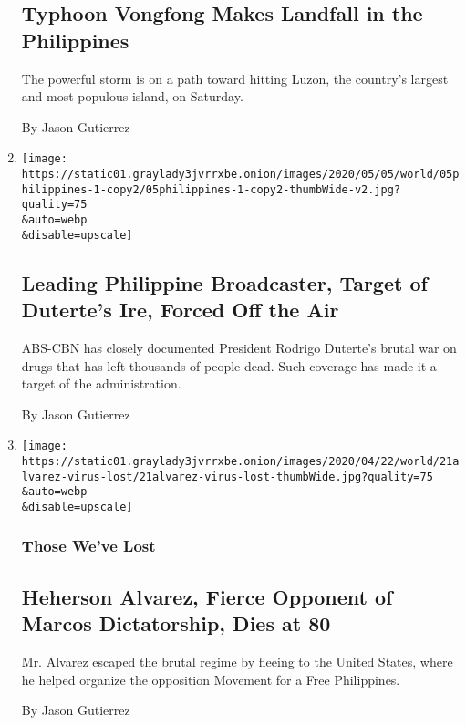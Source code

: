 \begin{enumerate}
  \hypertarget{typhoon-vongfong-makes-landfall-in-the-philippines}{%
  \subsection{Typhoon Vongfong Makes Landfall in the
  Philippines}\label{typhoon-vongfong-makes-landfall-in-the-philippines}}

  The powerful storm is on a path toward hitting Luzon, the country's
  largest and most populous island, on Saturday.

  By Jason Gutierrez
\item
  \href{/2020/05/05/world/asia/philippines-abs-cbn-duterte.html}{}

  \texttt{[image: https://static01.graylady3jvrrxbe.onion/images/2020/05/05/world/05philippines-1-copy2/05philippines-1-copy2-thumbWide-v2.jpg?quality=75\\\&auto=webp\\\&disable=upscale]}

  \hypertarget{leading-philippine-broadcaster-target-of-dutertes-ire-forced-off-the-air}{%
  \subsection{Leading Philippine Broadcaster, Target of Duterte's Ire,
  Forced Off the
  Air}\label{leading-philippine-broadcaster-target-of-dutertes-ire-forced-off-the-air}}

  ABS-CBN has closely documented President Rodrigo Duterte's brutal war
  on drugs that has left thousands of people dead. Such coverage has
  made it a target of the administration.

  By Jason Gutierrez
\item
  \href{/2020/04/21/obituaries/heherson-alvarez-coronavirus-dead.html}{}

  \texttt{[image: https://static01.graylady3jvrrxbe.onion/images/2020/04/22/world/21alvarez-virus-lost/21alvarez-virus-lost-thumbWide.jpg?quality=75\\\&auto=webp\\\&disable=upscale]}

  \hypertarget{those-weve-lost}{%
  \subsubsection{Those We've Lost}\label{those-weve-lost}}

  \hypertarget{heherson-alvarez-fierce-opponent-of-marcos-dictatorship-dies-at-80}{%
  \subsection{Heherson Alvarez, Fierce Opponent of Marcos Dictatorship,
  Dies at
  80}\label{heherson-alvarez-fierce-opponent-of-marcos-dictatorship-dies-at-80}}

  Mr. Alvarez escaped the brutal regime by fleeing to the United States,
  where he helped organize the opposition Movement for a Free
  Philippines.

  By Jason Gutierrez
\end{enumerate}

